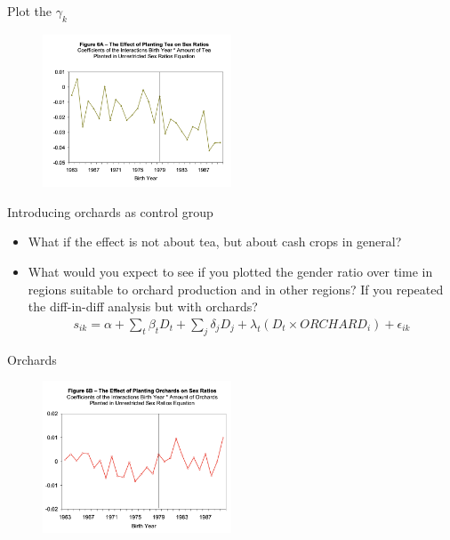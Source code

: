 \documentclass[11pt,notes=hide,aspectratio=169,mathserif]{beamer}
\begin{document}
\begin{frame}{Plot the $\gamma_k$}
\begin{figure}
\centering
\includegraphics[width=0.5\textwidth]{inputs/tea.png}
\end{figure}
\end{frame}

\begin{frame}{Introducing orchards as control group}
\begin{itemize}
\item What if the effect is not about tea, but about cash crops in general?
\pause  \item What would you expect to see if you plotted the gender ratio over time in regions suitable to orchard production and in other regions?
If you repeated the diff-in-diff analysis but with orchards?
\pause  \begin{align*}
s_{ik} = \alpha + \sum_t \beta_t D_t + \sum_j \delta_j D_j + \lambda_t (D_t \times ORCHARD_i) + \epsilon_{ik}
\end{align*}
\end{itemize}
\end{frame}

\begin{frame}{Orchards}
\begin{figure}
\centering
\includegraphics[width=0.5\textwidth]{inputs/orchards.png}
\end{figure}
\end{frame}
\end{document}
